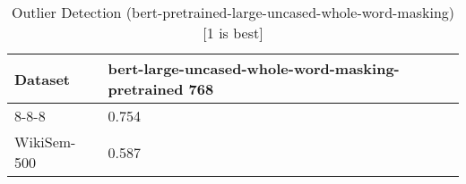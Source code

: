 \begin{table}[]
\centering
\begin{tabular}{l|l}
\hline
Dataset & bert-large-uncased-whole-word-masking-pretrained 768 \\
\hline
8-8-8 & 0.754 \\ 
WikiSem-500 & 0.587
\end{tabular}
\caption{Outlier Detection (bert-pretrained-large-uncased-whole-word-masking) [1 is best]}
\label{tab:outlier-bert-pretrained-large-uncased-whole-word-masking}
\end{table}
